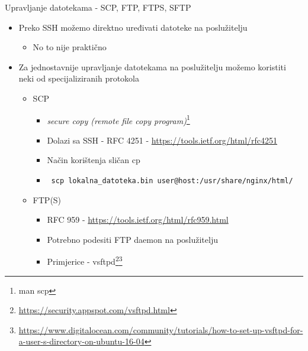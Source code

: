 \documentclass[t]{beamer}
\begin{document}
\begin{frame}{Upravljanje datotekama - SCP, FTP, FTPS, SFTP}
    \begin{itemize}
        \item Preko SSH možemo direktno uređivati datoteke na poslužitelju
        \begin{itemize}
            \item No to nije praktično
        \end{itemize}
        \item Za jednostavnije upravljanje datotekama na poslužitelju možemo koristiti neki od specijaliziranih protokola
        \begin{itemize}
            \item SCP
            \begin{itemize}
                \item \textit{secure copy (remote file copy program)}\footnote{man scp}
                \item Dolazi sa SSH - RFC 4251 - \url{https://tools.ietf.org/html/rfc4251}
                \item Način korištenja sličan cp
                \item \texttt{
                    scp lokalna\_datoteka.bin user@host:/usr/share/nginx/html/
                }
            \end{itemize}
            \item FTP(S)
            \begin{itemize}
                \item RFC 959 - \url{https://tools.ietf.org/html/rfc959.html}
                \item Potrebno podesiti FTP daemon na poslužitelju
                \item Primjerice - vsftpd\footnote{\url{https://security.appspot.com/vsftpd.html}}\footnote{\url{https://www.digitalocean.com/community/tutorials/how-to-set-up-vsftpd-for-a-user-s-directory-on-ubuntu-16-04}}
            \end{itemize}
        \end{itemize}
    \end{itemize}
\end{frame}
\end{document}
